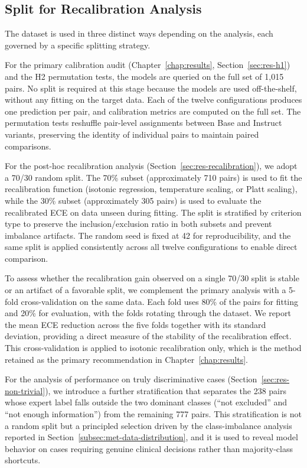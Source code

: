 \subsection{Split for Recalibration Analysis}
\label{subsec:met-data-split}

The dataset is used in three distinct ways depending on the analysis, each 
governed by a specific splitting strategy.

For the primary calibration audit (Chapter~\ref{chap:results}, 
Section~\ref{sec:res-h1}) and the H2 permutation tests, the models are 
queried on the full set of 1{,}015 pairs. No split is required at this 
stage because the models are used off-the-shelf, without any fitting on 
the target data. Each of the twelve configurations produces one prediction 
per pair, and calibration metrics are computed on the full set. The 
permutation tests reshuffle pair-level assignments between Base and 
Instruct variants, preserving the identity of individual pairs to 
maintain paired comparisons.

For the post-hoc recalibration analysis (Section~\ref{sec:res-recalibration}), 
we adopt a 70/30 random split. The 70\% subset (approximately 710 pairs) 
is used to fit the recalibration function (isotonic regression, 
temperature scaling, or Platt scaling), while the 30\% subset 
(approximately 305 pairs) is used to evaluate the recalibrated ECE on 
data unseen during fitting. The split is stratified by criterion type to 
preserve the inclusion/exclusion ratio in both subsets and prevent 
imbalance artifacts. The random seed is fixed at 42 for reproducibility, 
and the same split is applied consistently across all twelve 
configurations to enable direct comparison.

To assess whether the recalibration gain observed on a single 70/30 
split is stable or an artifact of a favorable split, we complement the 
primary analysis with a 5-fold cross-validation on the same data. Each 
fold uses 80\% of the pairs for fitting and 20\% for evaluation, with 
the folds rotating through the dataset. We report the mean ECE reduction 
across the five folds together with its standard deviation, providing a 
direct measure of the stability of the recalibration effect. This 
cross-validation is applied to isotonic recalibration only, which is the 
method retained as the primary recommendation in Chapter~\ref{chap:results}.

For the analysis of performance on truly discriminative cases 
(Section~\ref{sec:res-non-trivial}), we introduce a further stratification 
that separates the 238 pairs whose expert label falls outside the two 
dominant classes (``not excluded'' and ``not enough information'') from 
the remaining 777 pairs. This stratification is not a random split but a 
principled selection driven by the class-imbalance analysis reported in 
Section~\ref{subsec:met-data-distribution}, and it is used to reveal 
model behavior on cases requiring genuine clinical decisions rather than 
majority-class shortcuts.

